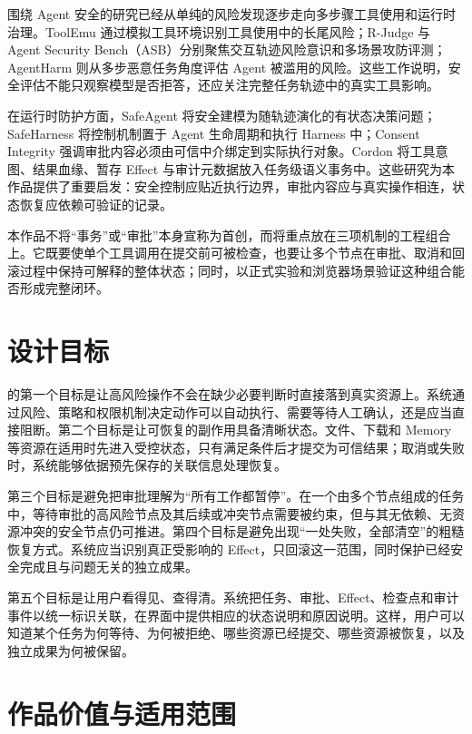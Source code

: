 围绕 Agent 安全的研究已经从单纯的风险发现逐步走向多步骤工具使用和运行时治理。ToolEmu 通过模拟工具环境识别工具使用中的长尾风险\cite{ruan2024toolemu}；R-Judge 与 Agent Security Bench（ASB）分别聚焦交互轨迹风险意识和多场景攻防评测\cite{yuan2024rjudge,zhang2025asb}；AgentHarm 则从多步恶意任务角度评估 Agent 被滥用的风险\cite{andriushchenko2025agentharm}。这些工作说明，安全评估不能只观察模型是否拒答，还应关注完整任务轨迹中的真实工具影响。

在运行时防护方面，SafeAgent 将安全建模为随轨迹演化的有状态决策问题\cite{liu2026safeagent}；SafeHarness 将控制机制置于 Agent 生命周期和执行 Harness 中\cite{lin2026safeharness}；Consent Integrity 强调审批内容必须由可信中介绑定到实际执行对象\cite{weng2026consent}。Cordon 将工具意图、结果血缘、暂存 Effect 与审计元数据放入任务级语义事务中\cite{chen2026cordon}。这些研究为本作品提供了重要启发：安全控制应贴近执行边界，审批内容应与真实操作相连，状态恢复应依赖可验证的记录。

本作品不将“事务”或“审批”本身宣称为首创，而将重点放在三项机制的工程组合上。它既要使单个工具调用在提交前可被检查，也要让多个节点在审批、取消和回滚过程中保持可解释的整体状态；同时，以正式实验和浏览器场景验证这种组合能否形成完整闭环。

\section{设计目标}

\Aegis{} 的第一个目标是让高风险操作不会在缺少必要判断时直接落到真实资源上。系统通过风险、策略和权限机制决定动作可以自动执行、需要等待人工确认，还是应当直接阻断。第二个目标是让可恢复的副作用具备清晰状态。文件、下载和 Memory 等资源在适用时先进入受控状态，只有满足条件后才提交为可信结果；取消或失败时，系统能够依据预先保存的关联信息处理恢复。

第三个目标是避免把审批理解为“所有工作都暂停”。在一个由多个节点组成的任务中，等待审批的高风险节点及其后续或冲突节点需要被约束，但与其无依赖、无资源冲突的安全节点仍可推进。第四个目标是避免出现“一处失败，全部清空”的粗糙恢复方式。系统应当识别真正受影响的 Effect，只回滚这一范围，同时保护已经安全完成且与问题无关的独立成果。

第五个目标是让用户看得见、查得清。系统把任务、审批、Effect、检查点和审计事件以统一标识关联，在界面中提供相应的状态说明和原因说明。这样，用户可以知道某个任务为何等待、为何被拒绝、哪些资源已经提交、哪些资源被恢复，以及独立成果为何被保留。

\section{作品价值与适用范围}

